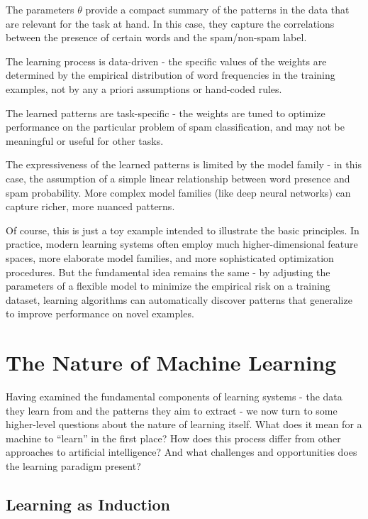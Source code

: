 \documentclass[
  9pt,
  letterpaper,
  abstract,
  titlepage]{scrbook}
\begin{document}
The parameters \(θ\) provide a compact summary of the patterns in the
data that are relevant for the task at hand. In this case, they capture
the correlations between the presence of certain words and the
spam/non-spam label.

The learning process is data-driven - the specific values of the weights
are determined by the empirical distribution of word frequencies in the
training examples, not by any a priori assumptions or hand-coded rules.

The learned patterns are task-specific - the weights are tuned to
optimize performance on the particular problem of spam classification,
and may not be meaningful or useful for other tasks.

The expressiveness of the learned patterns is limited by the model
family - in this case, the assumption of a simple linear relationship
between word presence and spam probability. More complex model families
(like deep neural networks) can capture richer, more nuanced patterns.

Of course, this is just a toy example intended to illustrate the basic
principles. In practice, modern learning systems often employ much
higher-dimensional feature spaces, more elaborate model families, and
more sophisticated optimization procedures. But the fundamental idea
remains the same - by adjusting the parameters of a flexible model to
minimize the empirical risk on a training dataset, learning algorithms
can automatically discover patterns that generalize to improve
performance on novel examples.

\section{The Nature of Machine
Learning}\label{the-nature-of-machine-learning}

Having examined the fundamental components of learning systems - the
data they learn from and the patterns they aim to extract - we now turn
to some higher-level questions about the nature of learning itself. What
does it mean for a machine to ``learn'' in the first place? How does
this process differ from other approaches to artificial intelligence?
And what challenges and opportunities does the learning paradigm
present?

\subsection{Learning as Induction}\label{learning-as-induction}
\end{document}
